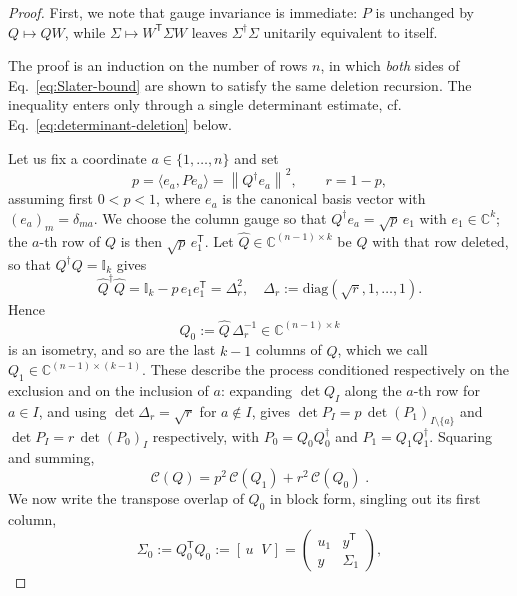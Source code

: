 \documentclass[aps,prl,twocolumn,superscriptaddress,reprint,longbibliography,nofootinbib]{revtex4-2}
\newcommand{\trans}{\mathsf{T}}
\begin{document}
\begin{proof}
First, we note that gauge invariance is immediate: $P$ is unchanged by $Q\mapsto QW$, while $\Sigma\mapsto W^{\trans}\Sigma W$ leaves $\Sigma^\dagger\Sigma$ unitarily equivalent to itself.

The proof is an induction on the number of rows $n$, in which \emph{both} sides of Eq.~\eqref{eq:Slater-bound} are shown to satisfy the same deletion recursion. The inequality enters only through a single determinant estimate, cf. Eq.~\eqref{eq:determinant-deletion} below.


Let us fix a coordinate $a\in \{1,\dots,n\}$ and set
\begin{equation}
    p=\langle e_a, P e_a\rangle=\left\lVert Q^\dagger e_a\right\rVert^2 ,\qquad r=1-p ,
\end{equation}
assuming first $0<p<1$, where $e_a$ is the canonical basis vector with $(e_a)_m=\delta_{ma}$.
We choose the column gauge so that $Q^\dagger e_a=\sqrt p\,e_1$ with $e_1\in\mathbb{C}^k$; the $a$-th row of $Q$ is then $\sqrt p\,e_1^{\trans}$. Let $\widehat Q\in\mathbb{C}^{(n-1)\times k}$ be $Q$ with that row deleted, so that $Q^\dagger Q=\mathbb{I}_k$ gives
\begin{equation}
    \widehat Q^\dagger\widehat Q=\mathbb{I}_k-p\,e_1e_1^{\trans}=\Delta_r^2 ,
    \quad
    \Delta_r:=\mathrm{diag}(\sqrt r,1,\dots,1).\end{equation}
Hence
\begin{equation}
    Q_0:=\widehat Q\,\Delta_r^{-1}\in\mathbb{C}^{(n-1)\times k}
\end{equation}
is an isometry, and so are the last $k-1$ columns of $\widehat Q$, which we call $Q_1\in\mathbb{C}^{(n-1)\times(k-1)}$. These describe the process conditioned respectively on the exclusion and on the inclusion of $a$: expanding $\det Q_I$ along the $a$-th row for $a\in I$, and using $\det\Delta_r=\sqrt r$ for $a\notin I$, gives $\det P_I=p\,\det (P_1)_{I\setminus\{a\}}$ and $\det P_I=r\,\det (P_0)_I$ respectively, with $P_0=Q_0Q_0^\dagger$ and $P_1=Q_1Q_1^\dagger$. Squaring and summing,
\begin{equation}
    \mathcal{C}(Q)=p^2\,\mathcal{C}(Q_1)+r^2\,\mathcal{C}(Q_0)\;.
    \label{eq:collision-deletion}
\end{equation}
We now write the transpose overlap of $Q_0$ in block form, singling out its first column,
\begin{equation}
\Sigma_0:=Q_0^{\trans}Q_0:=\left[\,u\;\;V\,\right]
    =\begin{pmatrix} u_1&y^{\trans}\\ y&\Sigma_1\end{pmatrix},

\end{equation}
\end{proof}
\end{document}
